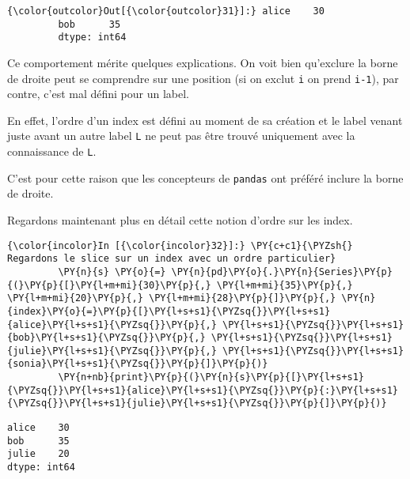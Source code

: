 \begin{Verbatim}[commandchars=\\\{\},frame=single,framerule=0.3mm,rulecolor=\color{cellframecolor}]
{\color{outcolor}Out[{\color{outcolor}31}]:} alice    30
         bob      35
         dtype: int64
\end{Verbatim}
            
    Ce comportement mérite quelques explications. On voit bien qu'exclure la
borne de droite peut se comprendre sur une position (si on exclut
\texttt{i} on prend \texttt{i-1}), par contre, c'est mal défini pour un
label.

En effet, l'ordre d'un index est défini au moment de sa création et le
label venant juste avant un autre label \texttt{L} ne peut pas être
trouvé uniquement avec la connaissance de \texttt{L}.

C'est pour cette raison que les concepteurs de \texttt{pandas} ont
préféré inclure la borne de droite.

Regardons maintenant plus en détail cette notion d'ordre sur les index.

    \begin{Verbatim}[commandchars=\\\{\},frame=single,framerule=0.3mm,rulecolor=\color{cellframecolor}]
{\color{incolor}In [{\color{incolor}32}]:} \PY{c+c1}{\PYZsh{} Regardons le slice sur un index avec un ordre particulier}
         \PY{n}{s} \PY{o}{=} \PY{n}{pd}\PY{o}{.}\PY{n}{Series}\PY{p}{(}\PY{p}{[}\PY{l+m+mi}{30}\PY{p}{,} \PY{l+m+mi}{35}\PY{p}{,} \PY{l+m+mi}{20}\PY{p}{,} \PY{l+m+mi}{28}\PY{p}{]}\PY{p}{,} \PY{n}{index}\PY{o}{=}\PY{p}{[}\PY{l+s+s1}{\PYZsq{}}\PY{l+s+s1}{alice}\PY{l+s+s1}{\PYZsq{}}\PY{p}{,} \PY{l+s+s1}{\PYZsq{}}\PY{l+s+s1}{bob}\PY{l+s+s1}{\PYZsq{}}\PY{p}{,} \PY{l+s+s1}{\PYZsq{}}\PY{l+s+s1}{julie}\PY{l+s+s1}{\PYZsq{}}\PY{p}{,} \PY{l+s+s1}{\PYZsq{}}\PY{l+s+s1}{sonia}\PY{l+s+s1}{\PYZsq{}}\PY{p}{]}\PY{p}{)}
         \PY{n+nb}{print}\PY{p}{(}\PY{n}{s}\PY{p}{[}\PY{l+s+s1}{\PYZsq{}}\PY{l+s+s1}{alice}\PY{l+s+s1}{\PYZsq{}}\PY{p}{:}\PY{l+s+s1}{\PYZsq{}}\PY{l+s+s1}{julie}\PY{l+s+s1}{\PYZsq{}}\PY{p}{]}\PY{p}{)}
\end{Verbatim}


    \begin{Verbatim}[commandchars=\\\{\},frame=single,framerule=0.3mm,rulecolor=\color{cellframecolor}]
alice    30
bob      35
julie    20
dtype: int64
\end{Verbatim}

